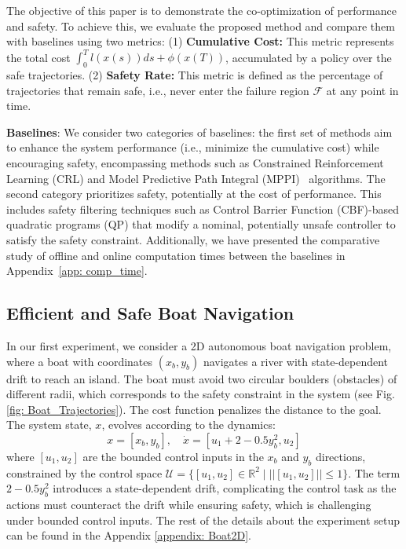 The objective of this paper is to demonstrate the co-optimization of performance and safety. To achieve this, we evaluate the proposed method and compare them with baselines using two metrics: (1) \textbf{Cumulative Cost:} This metric represents the total cost  $\int_0^{T}l(x(s)) ds + \phi(x(T))$, accumulated by a policy over the safe trajectories. (2) \textbf{Safety Rate:} This metric is defined as the percentage of trajectories that remain safe, i.e., never enter the failure region $\mathcal{F}$ at any point in time.

\textbf{Baselines}: We consider two categories of baselines: the first set of methods aim to enhance the system performance (i.e., minimize the cumulative cost) while encouraging safety, encompassing methods such as Constrained Reinforcement Learning (CRL) and Model Predictive Path Integral (MPPI)~\cite{8558663} algorithms. 
The second category prioritizes safety,  potentially at the cost of performance. This includes safety filtering techniques such as Control Barrier Function (CBF)-based quadratic programs (QP) \cite{Ames_2017} that modify a nominal, potentially unsafe controller to satisfy the safety constraint. Additionally, we have presented the comparative study of offline and online computation times between the baselines in Appendix~\ref{app: comp_time}.
\vspace{-1em}
\subsection{Efficient and Safe Boat Navigation}
In our first experiment, we consider a 2D autonomous boat navigation problem, where a boat with coordinates $(x_b, y_b)$ navigates a river with state-dependent drift to reach an island. The boat must avoid two circular boulders (obstacles) of different radii, which corresponds to the safety constraint in the system (see Fig. \ref{fig: Boat_Trajectories}).
The cost function penalizes the distance to the goal.
The system state, $x$, evolves according to the dynamics:  
\vspace{-1em}
\begin{equation}
    x = [x_b, y_b], \quad \dot{x} = [u_1 + 2 - 0.5y_b^2, u_2]
\end{equation}
where $[u_1, u_2]$ are the bounded control inputs in the $x_b$ and $y_b$ directions, constrained by the control space $\mathcal{U} = \{[u_1, u_2] \in \mathbb{R}^2 \mid ||[u_1, u_2]|| \leq 1\}$. The term $2 - 0.5y_b^2$ introduces a state-dependent drift, complicating the control task as the actions must counteract the drift while ensuring safety, which is challenging under bounded control inputs. 
The rest of the details about the experiment setup can be found in the Appendix \ref{appendix: Boat2D}.

